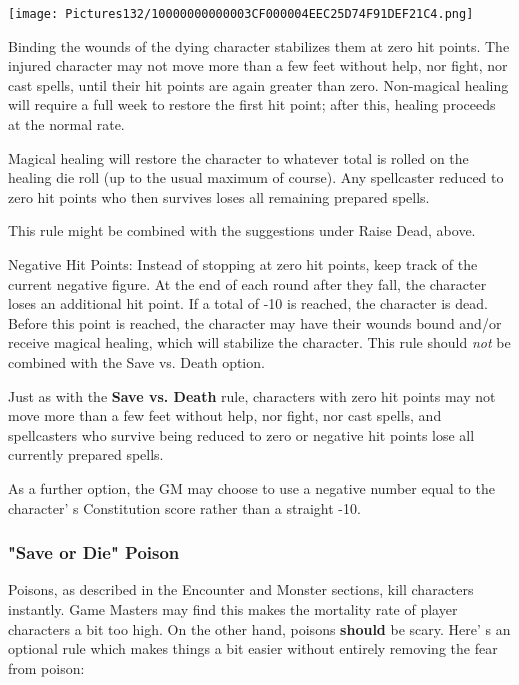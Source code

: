 \documentclass[a4paper,twoside,openany,10pt]{book}
\begin{document}
\begin{multicols}{2}
\begin{center}
	\texttt{[image: Pictures132/10000000000003CF000004EEC25D74F91DEF21C4.png]}
\end{center}

Binding the wounds of the dying character stabilizes them at zero hit points. The injured character may not move more than a few feet without help, nor fight, nor cast spells, until their hit points are again greater than zero. Non-magical healing will require a full week to restore the first hit point; after this, healing proceeds at the normal rate.

Magical healing will restore the character to whatever total is rolled on the healing die roll (up to the usual maximum of course).  Any spellcaster reduced to zero hit points who then survives loses all remaining prepared spells.

This rule might be combined with the suggestions under Raise Dead, above.

Negative Hit Points: Instead of stopping at zero hit points, keep track of the current negative figure. At the end of each round after they fall, the character loses an additional hit point. If a total of -10 is  reached, the character is dead. Before this point is reached, the character may have their wounds bound and/or receive magical healing, which will stabilize the character. This rule should \emph{not} be combined with the Save vs. Death option.

Just as with the \textbf{Save vs. Death} rule, characters with zero hit points may not move more than a few feet without help, nor fight, nor cast spells, and spellcasters who survive being reduced to zero or negative hit points lose all currently prepared spells.

As a further option, the GM may choose to use a negative number equal to the character' s Constitution score rather than a straight -10.

\subsubsection{"Save or Die" Poison}\label{save-or-die-poison}

Poisons, as described in the Encounter and Monster sections, kill characters instantly. Game Masters may find this makes the mortality rate of player characters a bit too high. On the other hand, poisons \textbf{should} be scary. Here' s an optional rule which makes things a bit easier without entirely removing the fear from poison:


\end{multicols}
\end{document}
